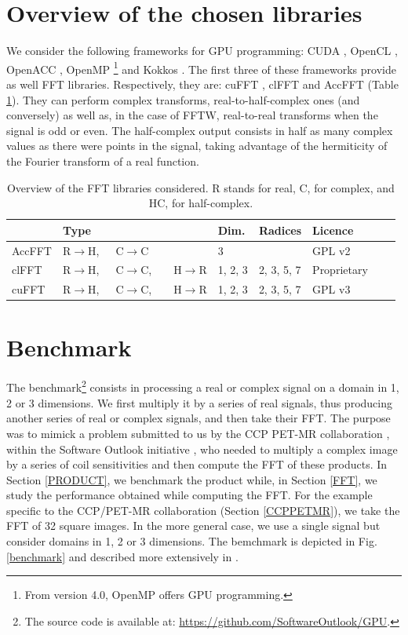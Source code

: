 \documentclass[12pt, a4paper]{article}
\begin{document}
\section{Overview of the chosen libraries}
We consider the following frameworks for GPU programming: CUDA \cite{cuda}, OpenCL \cite{opencl}, \mbox{OpenACC} \cite{openacc}, OpenMP \cite{openmp}\footnote{From version 4.0, OpenMP offers GPU programming.} and Kokkos \cite{kokkos}. The first three of these frameworks provide as well FFT libraries. Respectively, they are: cuFFT \cite{cufft}, clFFT \cite{clfft} and AccFFT \cite{accfft} (Table \ref{ffttable}). They can perform complex transforms, real-to-half-complex ones (and conversely) as well as, in the case of FFTW, real-to-real transforms when the signal is odd or even. The half-complex output consists in half as many complex values as there were points in the signal, taking advantage of the hermiticity of the Fourier transform of a real function.\\
\begin{table}[H]
\captionsetup{width=0.8\textwidth}
\centering
\begin{tabular}{|p{2.5cm}||p{2.5cm}|p{1cm}|p{3cm}|p{3cm}|p{2cm}|p{2cm}|}
\hline
& Type & Dim. & Radices & Licence \\
\hline
\hline
AccFFT & R$\to$H,\ \ \  C$\to$C& 3& & GPL v2\\
\hline
clFFT  &  R$\to$H,\ \ \  C$\to$C,\ \ \ \  H$\to$R& 1, 2, 3 & 2, 3, 5, 7 & Proprietary\\
\hline
cuFFT  &  R$\to$H,\ \ \  C$\to$C,\ \ \ \  H$\to$R & 1, 2, 3 & 2, 3, 5, 7 & GPL v3\\
\hline
\end{tabular}
\caption{Overview of the FFT libraries considered. R stands for real, C, for complex, and HC, for half-complex.}
\label{ffttable}
\end{table}
\section{Benchmark}
The benchmark\footnote{The source code is available at: \hyperlink{https://github.com/SoftwareOutlook/GPU}{https://github.com/SoftwareOutlook/GPU}.} consists in processing a real or complex signal on a domain in 1, 2 or 3 dimensions. We first multiply it by a series of real signals, thus producing another series of real or complex signals, and then take their FFT.  The purpose was to mimick a problem submitted to us by the CCP PET-MR collaboration \cite{ccppetmr}, within the Software Outlook initiative \cite{softwareoutlook}, who needed to multiply a complex image by a series of coil sensitivities and then compute the FFT of these products. In Section \ref{PRODUCT}, we benchmark the product while, in Section \ref{FFT}, we study the performance obtained while computing the FFT. For the example specific to the CCP/PET-MR collaboration (Section \ref{CCPPETMR}), we take the FFT of 32 square images. In the more general case, we use a single signal but consider domains in 1, 2 or 3 dimensions. The bemchmark is depicted in Fig. \ref{benchmark} and described more extensively in \cite{FFTREPORT}.\\
\end{document}
